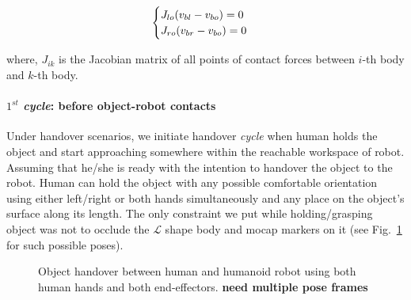\begin{equation}\label{vel_const}
\centering
\begin{cases}
J_{lo}(v_{bl} - v_{bo}) = 0\\
J_{ro}(v_{br} - v_{bo}) = 0\\
\end{cases}
\end{equation}

where, $J_{ik}$ is the Jacobian matrix of all points of contact forces between $i$-th body and $k$-th body.


\paragraph*{$1^{st}$ \textit{cycle}: before object-robot contacts} 
Under handover scenarios, we initiate handover \textit{cycle} when human holds the object and start approaching somewhere within the reachable workspace of robot. Assuming that he/she is ready with the intention to handover the object to the robot. Human can hold the object with any possible comfortable orientation using either left/right or both hands simultaneously and any place on the object's surface along its length. The only constraint we put while holding/grasping object was not to occlude the $\mathcal{L}$ shape body and mocap markers on it (see Fig.~\ref{fig:h-r-pipe-handover} for such possible poses).


\begin{figure}[hptb]
	\caption{Object handover between human and humanoid robot using both human hands and both end-effectors. \textbf{need multiple pose frames}}
	\label{fig:h-r-pipe-handover}
\end{figure}

